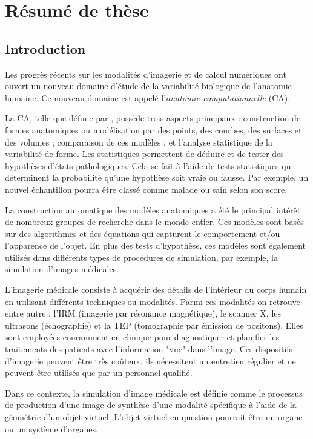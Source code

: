 \chapter{Résumé de thèse}
\label{chapter:IntroductionFR}

\section{Introduction}

Les progrès récents sur les modalités d'imagerie et de calcul numériques ont ouvert un nouveau 
domaine d'étude de la variabilité biologique de l'anatomie humaine. Ce nouveau domaine est appelé 
l'\textit{anatomie computationnelle} (CA).

La CA, telle que définie par \cite{Grenander1998}, possède trois aspects principaux : construction de formes 
anatomiques ou modélisation par des points, des courbes, des surfaces et des volumes ; comparaison de ces modèles ; 
et l'analyse statistique de la variabilité de forme.
Les statistiques permettent de déduire et de tester des hypothèses d'états pathologiques. 
Cela se fait à l'aide de tests statistiques qui déterminent la probabilité qu'une hypothèse soit vraie ou fausse. 
Par exemple, un nouvel échantillon pourra être classé comme malade ou sain 
selon son score.

La construction automatique des modèles anatomiques a été le principal intérêt de nombreux groupes de recherche dans le monde entier.
Ces modèles sont basés sur des algorithmes et des équations qui capturent le comportement et/ou l'apparence de l'objet.
En plus des tests d'hypothèse, ces modèles sont également utilisés dans différents types de procédures de simulation, 
par exemple, la simulation d'images médicales.

L'imagerie médicale consiste à acquérir des détails de l'intérieur du corps humain en utilisant différents techniques ou modalités.
Parmi ces modalités on retrouve entre autre : l'IRM (imagerie par résonance magnétique), 
le scanner X, les ultrasons (échographie)  et la TEP (tomographie par émission de positons). 
Elles sont employées couramment en clinique pour diagnostiquer et planifier les traitements des patients avec l'information "vue" dans l'image. Ces dispositifs d'imagerie peuvent être très coûteux, ils nécessitent un entretien régulier et ne peuvent être utilisés que par un personnel qualifié.

Dans ce contexte, la simulation d'image médicale est définie comme le processus de production d'une image de synthèse d'une modalité spécifique à l'aide de la géométrie d'un objet virtuel. 
L'objet virtuel en question pourrait être un organe ou un système d'organes.

